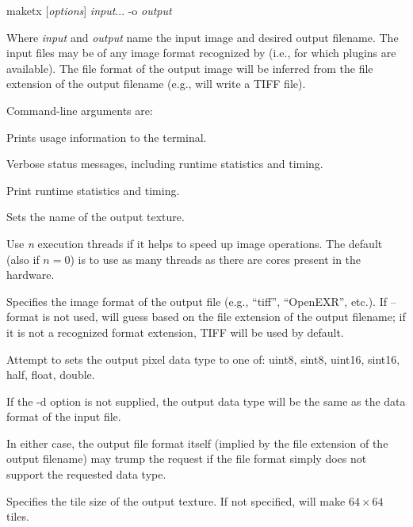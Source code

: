 \medskip

\hspace{0.25in} {\cf maketx} [\emph{options}] \emph{input}... {\cf -o} \emph{output}

\medskip

Where \emph{input} and \emph{output} name the input image and desired
output filename.  The input files may be of any image format recognized by
\product (i.e., for which \ImageInput plugins are available).  The file
format of the output image will be inferred from the file extension of
the output filename (e.g.,  will write a TIFF file).

\medskip
\newpage

\noindent Command-line arguments are:

Prints usage information to the terminal.
\apiend

Verbose status messages, including runtime statistics and timing.
\apiend

Print runtime statistics and timing.
\apiend

Sets the name of the output texture.
\apiend

Use \emph{n} execution threads if it helps to speed up image operations.
The default (also if $n=0$) is to use as many threads as there are cores
present in the hardware.
\apiend

Specifies the image format of the output file (e.g., ``tiff'',
``OpenEXR'', etc.).  If {\cf --format} is not used, \maketx will 
guess based on the file extension of the output filename; if it
is not a recognized format extension, TIFF will be used by default.
\apiend

Attempt to sets the output pixel data type to one of: {\cf uint8}, 
{\cf sint8}, {\cf uint16}, {\cf sint16}, {\cf half}, {\cf float}, 
{\cf double}.

If the {\cf -d} option is not supplied, the output data type will
be the same as the data format of the input file.

In either case, the output file format itself (implied by the file
extension of the output filename) may trump the request if the file
format simply does not support the requested data type.
\apiend

Specifies the tile size of the output texture.  If not specified,
\maketx will make $64 \times 64$ tiles.
\apiend

